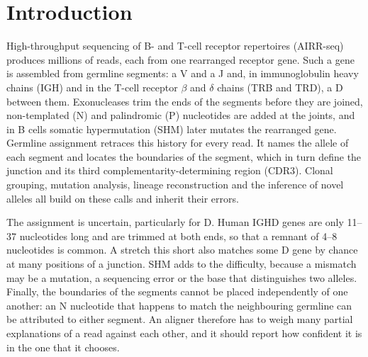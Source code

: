 \documentclass[11pt,a4paper]{article}
\begin{document}
\section{Introduction}

High-throughput sequencing of B- and T-cell receptor repertoires (AIRR-seq)
produces millions of reads, each from one rearranged receptor gene. Such a
gene is assembled from germline segments: a V and a J and, in immunoglobulin
heavy chains (IGH) and in the T-cell receptor $\beta$ and $\delta$ chains
(TRB and TRD), a D between them. Exonucleases trim the ends of the segments
before they are joined, non-templated (N) and palindromic (P) nucleotides
are added at the joints, and in B cells somatic hypermutation (SHM) later
mutates the rearranged gene. Germline assignment retraces this history for
every read. It names the allele of each segment and locates the boundaries
of the segment, which in turn define the junction and its third
complementarity-determining region (CDR3). Clonal grouping, mutation
analysis, lineage reconstruction and the inference of novel alleles all
build on these calls and inherit their errors.

The assignment is uncertain, particularly for D. Human IGHD genes are only
11--37 nucleotides long and are trimmed at both ends, so that a remnant of
4--8 nucleotides is common. A stretch this short also matches some D gene by
chance at many positions of a junction. SHM adds
to the difficulty, because a mismatch may be a mutation, a sequencing error
or the base that distinguishes two alleles. Finally, the boundaries of the
segments cannot be placed independently of one another: an N nucleotide that
happens to match the neighbouring germline can be attributed to either
segment. An aligner therefore has to weigh many partial explanations of a
read against each other, and it should report how confident it is in the one
that it chooses.
\end{document}
